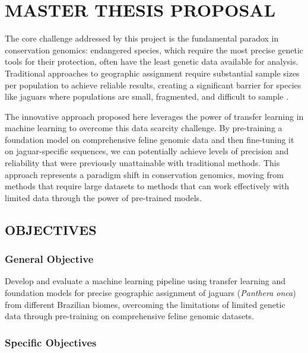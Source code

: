 \chapter{MASTER THESIS PROPOSAL}
\label{chap:proposal}

The core challenge addressed by this project is the fundamental paradox in conservation genomics: endangered species, which require the most precise genetic tools for their protection, often have the least genetic data available for analysis. Traditional approaches to geographic assignment require substantial sample sizes per population to achieve reliable results, creating a significant barrier for species like jaguars where populations are small, fragmented, and difficult to sample \cite{shafer2015genomics}.

The innovative approach proposed here leverages the power of transfer learning in machine learning to overcome this data scarcity challenge. By pre-training a foundation model on comprehensive feline genomic data and then fine-tuning it on jaguar-specific sequences, we can potentially achieve levels of precision and reliability that were previously unattainable with traditional methods. This approach represents a paradigm shift in conservation genomics, moving from methods that require large datasets to methods that can work effectively with limited data through the power of pre-trained models.

\section{OBJECTIVES}

\subsection{General Objective}

Develop and evaluate a machine learning pipeline using transfer learning and foundation models for precise geographic assignment of jaguars (\textit{Panthera onca}) from different Brazilian biomes, overcoming the limitations of limited genetic data through pre-training on comprehensive feline genomic datasets.

\subsection{Specific Objectives}

